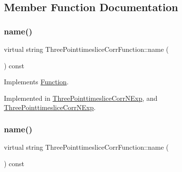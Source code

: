 \subsection{Member Function Documentation}
\mbox{\label{classThreePointtimesliceCorrFunction_ad364af81f908825603c7810afdb7cb2d}} 
\subsubsection{\texorpdfstring{name()}{name()}\hspace{0.1cm}{\footnotesize\ttfamily [1/2]}}
{\footnotesize\ttfamily virtual string Three\+Pointtimeslice\+Corr\+Function\+::name (\begin{DoxyParamCaption}{ }\end{DoxyParamCaption}) const\hspace{0.3cm}{\ttfamily [pure virtual]}}



Implements \mbox{\hyperlink{classFunction_ac6dc83996d6f002141a0a0f66f2c6496}{Function}}.



Implemented in \mbox{\hyperlink{classThreePointtimesliceCorrNExp_aa137e909c6466275f495aac9f2d24178}{Three\+Pointtimeslice\+Corr\+N\+Exp}}, and \mbox{\hyperlink{classThreePointtimesliceCorrNExp_aa137e909c6466275f495aac9f2d24178}{Three\+Pointtimeslice\+Corr\+N\+Exp}}.

\mbox{\label{classThreePointtimesliceCorrFunction_ad364af81f908825603c7810afdb7cb2d}} 
\subsubsection{\texorpdfstring{name()}{name()}\hspace{0.1cm}{\footnotesize\ttfamily [2/2]}}
{\footnotesize\ttfamily virtual string Three\+Pointtimeslice\+Corr\+Function\+::name (\begin{DoxyParamCaption}{ }\end{DoxyParamCaption}) const\hspace{0.3cm}{\ttfamily [pure virtual]}}



